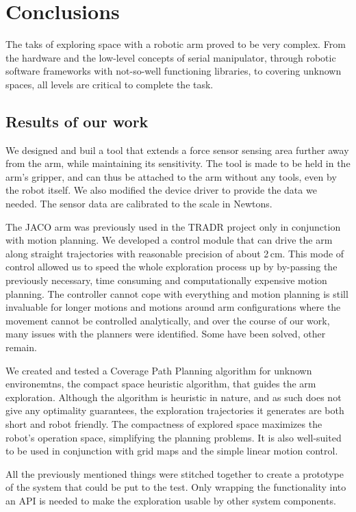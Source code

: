\documentclass[buriama8_dp.tex]{subfiles}
\begin{document}
\chapter{Conclusions}

The taks of exploring space with a robotic arm proved to be very complex. From the hardware and the low-level concepts of serial manipulator, through robotic software frameworks with not-so-well functioning libraries, to covering unknown spaces, all levels are critical to complete the task.


\section{Results of our work}
\label{sec:label}

We designed and buil a tool that extends a force sensor sensing area further away from the arm, while maintaining its sensitivity. The tool is made to be held in the arm's gripper, and can thus be attached to the arm without any tools, even by the robot itself. We also modified the device driver to provide the data we needed. The sensor data are calibrated to the scale in Newtons.

The JACO arm was previously used in the TRADR project only in conjunction with motion planning. We developed a control module that can drive the arm along straight trajectories with reasonable precision of about 2\,cm. This mode of control allowed us to speed the whole exploration process up by by-passing the previously necessary, time consuming and computationally expensive motion planning. The controller cannot cope with everything and motion planning is still invaluable for longer motions and motions around arm configurations where the movement cannot be controlled analytically, and over the course of our work, many issues with the planners were identified. Some have been solved, other remain.

We created and tested a Coverage Path Planning algorithm for unknown environemtns, the compact space heuristic algorithm, that guides the arm exploration. Although the algorithm is heuristic in nature, and as such does not give any optimality guarantees, the exploration trajectories it generates are both short and robot friendly. The compactness of explored space maximizes the robot's operation space, simplifying the planning problems. It is also well-suited to be used in conjunction with grid maps and the simple linear motion control.

All the previously mentioned things were stitched together to create a prototype of the system that could be put to the test. Only wrapping the functionality into an API is needed to make the exploration usable by other system components.
\end{document}
